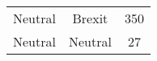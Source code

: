 \begin{table}[htp]
\begin{tabular}{ccc}
{\color[HTML]{656565} Neutral}                                    & {\color[HTML]{3166FF} Brexit}                                       & 350                                                                \\ 
{\color[HTML]{656565} Neutral}                                    & {\color[HTML]{656565} Neutral}                                      & 27                                                                 \\ \bottomrule
\end{tabular}
\end{table}